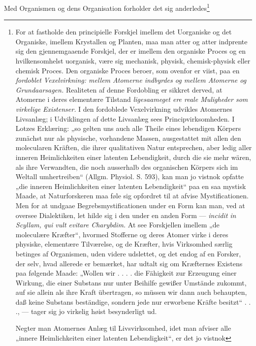 \documentclass[12pt,a4paper]{book}
\begin{document}
Med Organismen og dens Organisation forholder det sig
anderledes\footnote{For at fastholde den principielle Forskjel imellem
det Uorganiske og det Organiske, imellem Krystallen og Planten, maa man
atter og atter indprente sig den gjennemgaaende Forskjel, der er imellem
den organiske Proces og en hvilkensomhelst uorganisk,
være sig mechanisk, physisk, chemisk-physisk eller chemisk Proces. Den
organiske Proces beroer, som ovenfor er viist, paa en \emph{fordoblet
Vexelvirkning: mellem Atomerne indbyrdes og mellem Atomerne og
Grundaarsagen.} Realiteten af denne Fordobling er sikkret derved, at
Atomerne i deres elementære Tilstand \emph{ligesaameget ere reale
Muligheder som virkelige Existenser.} I den fordoblede Vexelvirkning
udvikles Atomernes Livsanlæg; i Udviklingen af dette Livsanlæg sees
Principvirksomheden. I Lotzes Erklæring: „so gelten uns auch alle Theile
eines lebendigen Körpers zunächst nur als physische, vorhandene Massen,
ausgestattet mit allen den molecularen Kräften, die ihrer qualitativen
Natur entsprechen, aber ledig aller inneren Heimlichkeiten einer latenten
Lebendigkeit, durch die sie mehr wären, als ihre Verwandten, die noch
ausserhalb des organischen Körpers sich im Weltall umhertreiben“ (Allgm.
Physiol. S. 593), kan man jo vistnok opfatte „die inneren Heimlichkeiten
einer latenten Lebendigkeit“ paa en saa mystisk Maade, at Naturforskeren
maa føle sig opfordret til at afvise Mystificationen. Men for at undgaae
Begrebsmystificationen under en Form kan man, ved at oversee Dialektiken,
let hilde sig i den under en anden Form --- \textit{incidit in Scyllam,
qui vult evitare Charybdim.} At see Forskjellen imellem „de moleculære
Kræfter“, hvormed Stofferne og deres Atomer virke i deres physiske,
elementære Tilværelse, og de Kræfter, hvis Virksomhed særlig betinges af
Organismen, uden videre udslettet, og det endog af en Forsker, der selv,
hvad allerede er bemærket, har udtalt sig om Kræfternes Existens paa
følgende Maade: „Wollen wir . . . . die Fähigkeit zur Erzeugung einer
Wirkung, die einer Substans nur unter Beihilfe gewißer Umstände zukommt,
auf sie allein als ihre Kraft übertragen, so müssen wir dann auch
behaupten, daß keine Substans beständige, sondern jede nur erworbene
Kräfte besitzt“ . . ., --- tager sig jo virkelig høist besynderligt ud.
\par Negter man Atomernes Anlæg til Livsvirksomhed, idet man afviser alle
„innere Heimlichkeiten einer latenten Lebendigkeit“, er det jo vistnok
}
\end{document}
